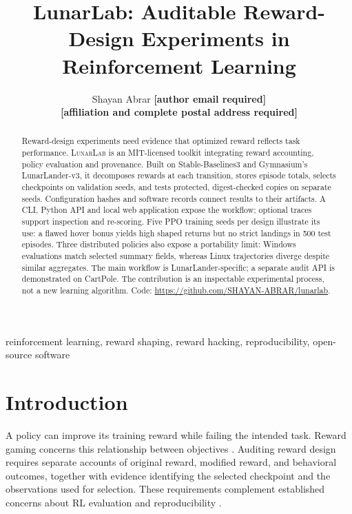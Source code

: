 \documentclass[twoside,11pt]{article}
\newcommand{\TODO}[1]{\textbf{[#1]}}
\newcommand{\lunarlab}{\textsc{LunarLab}}
\begin{document}
\title{LunarLab: Auditable Reward-Design Experiments in Reinforcement Learning}
\author{\name Shayan Abrar \email \TODO{author email required} \\
\addr \TODO{affiliation and complete postal address required}}
\maketitle

\begin{abstract}
Reward-design experiments need evidence that optimized reward reflects task performance. \lunarlab{} is an
MIT-licensed toolkit integrating reward accounting, policy evaluation and provenance. Built on Stable-Baselines3
and Gymnasium's LunarLander-v3, it decomposes rewards at each transition, stores episode totals, selects
checkpoints on validation seeds, and tests protected, digest-checked copies on separate seeds. Configuration
hashes and software records connect results to their artifacts. A CLI, Python API and local web application
expose the workflow; optional traces support inspection and re-scoring. Five PPO training seeds per design
illustrate its use: a flawed hover bonus yields high shaped returns but no strict landings in 500 test episodes.
Three distributed policies also expose a portability limit: Windows evaluations match selected summary fields,
whereas Linux trajectories diverge despite similar aggregates. The main workflow is LunarLander-specific;
a separate audit API is demonstrated on CartPole. The contribution is an inspectable experimental process,
not a new learning algorithm. Code: \url{https://github.com/SHAYAN-ABRAR/lunarlab}.
\end{abstract}
\begin{keywords}
reinforcement learning, reward shaping, reward hacking, reproducibility, open-source software
\end{keywords}

\section{Introduction}
A policy can improve its training reward while failing the intended task. Reward gaming concerns this
relationship between objectives \citep{skalse2022gaming}. Auditing reward design requires separate accounts of
original reward, modified reward, and behavioral outcomes, together with evidence identifying the selected
checkpoint and the observations used for selection. These requirements complement established concerns about
RL evaluation and reproducibility \citep{henderson2018matters,agarwal2021precipice}.
\end{document}

